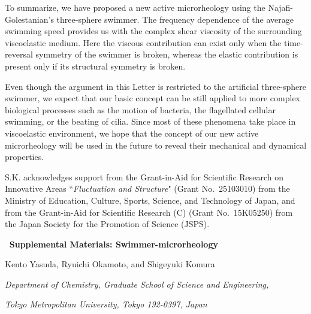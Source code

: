 \documentclass[nofootinbib,twocolumn,showpacs,preprintnumbers,pre,aps]{revtex4-1}
\begin{document}
To summarize, we have proposed a new active microrheology using the 
Najafi-Golestanian's three-sphere swimmer.
The frequency dependence of the average swimming 
speed provides us with the complex shear viscosity of the surrounding 
viscoelastic medium. 
Here the viscous contribution can exist only when the time-reversal symmetry 
of the swimmer is broken, whereas the elastic contribution is present only if its structural 
symmetry is broken. 


Even though the argument in this Letter is restricted to the artificial three-sphere swimmer, 
we expect that our basic concept can be still applied to more complex biological processes 
such as the motion of bacteria, the flagellated cellular swimming, or the beating of cilia. 
Since most of these phenomena take place in viscoelastic environment, we hope that the 
concept of our new active microrheology will be used in the future to reveal their mechanical 
and dynamical properties.


S.K. acknowledges support from the Grant-in-Aid for Scientific Research on
Innovative Areas ``\textit{Fluctuation and Structure}" (Grant No.\ 25103010) from the Ministry
of Education, Culture, Sports, Science, and Technology of Japan, and from 
the Grant-in-Aid for Scientific Research (C) (Grant No.\ 15K05250)
from the Japan Society for the Promotion of Science (JSPS).






\pagebreak

\onecolumngrid

\begin{center}
$\ $ 
{\large \textbf{Supplemental Materials: Swimmer-microrheology}}\\

$\ $ 

Kento Yasuda, Ryuichi Okamoto, and Shigeyuki Komura

\textit{Department of Chemistry, Graduate School of Science and Engineering,}

\textit{Tokyo Metropolitan University, Tokyo 192-0397, Japan}
\end{center}

\setcounter{equation}{0}
\renewcommand{\theequation}{S\arabic{equation}}   

\vspace{0.3in}
\end{document}
